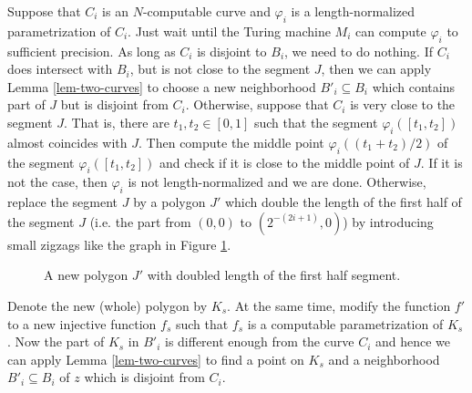 \documentclass{LMCS}
\theoremstyle{plain}
\begin{document}
Suppose that $C_i$ is an $N$-computable curve and $\varphi_i$ is a length-normalized parametrization of $C_i$. Just wait until the Turing machine $M_i$ can compute  $\varphi_i$ to sufficient precision. As long as $C_i$ is disjoint to $B_i$, we need to do nothing. If $C_i$ does intersect with $B_i$, but is not close to the segment $J$, then we can apply Lemma \ref{lem-two-curves} to choose a new neighborhood $B'_i \subseteq B_i$ which contains part of $J$ but is disjoint from $C_i$. Otherwise, suppose that $C_i$ is very close to the segment $J$. That is, there are $t_1, t_2\in [0,1]$ such that the segment $\varphi_i([t_1, t_2])$ almost coincides with $J$. Then compute the middle point $\varphi_i((t_1+t_2)/2)$ of the segment $\varphi_i([t_1, t_2])$  and check if it is close to the middle point of $J$. If it is not the case, then $\varphi_i$ is not length-normalized and we are done. Otherwise, replace the segment $J$ by a polygon $J'$ which double the length of the first half of the segment $J$ (i.e. the part from $(0,0)$ to $(2^{-(2i+1)}, 0)$) by introducing small zigzags like the graph in Figure \ref{fig-M-N}.

\begin{figure}[h]
\begin{center}
\end{center}
\caption{A new polygon $J'$ with doubled length of the first half segment.}\label{fig-M-N}
\end{figure}

\noindent Denote the new (whole) polygon by $K_s$. At the same time, modify the function $f'$ to a new injective function $f_s$ such that $f_s$ is a computable parametrization of $K_s$.  Now the part of $K_s$ in $B'_i$ is different enough from the curve $C_i$ and hence we can apply Lemma \ref{lem-two-curves} to find a point on $K_s$ and a neighborhood $B'_i \subseteq B_i$ of $z$  which is disjoint from $C_i$.
\end{document}
